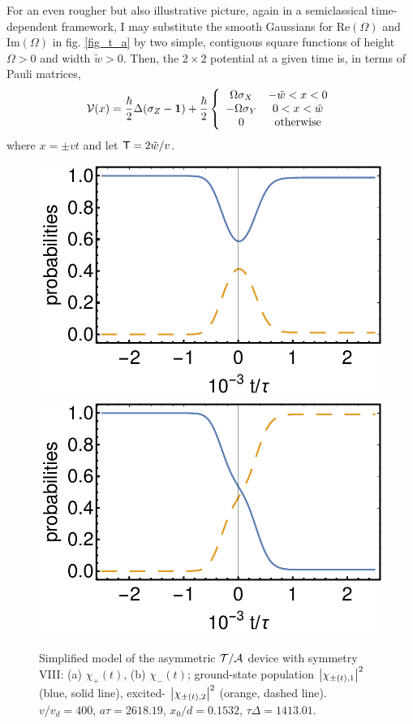 For an  even rougher but also illustrative picture,  again in a semiclassical time-dependent framework, I  may substitute the smooth Gaussians for Re$(\Omega)$ and Im$(\Omega)$ in fig. \ref{fig_t_a} by two simple, contiguous square functions of height
$\Omega>0$ and width $\tilde{w} > 0$. Then, the $2\times2$ potential at a given time is, in terms of Pauli matrices,
%
\begin{eqnarray}
  {\cal V} (x) = \frac{\hbar}{2}\Delta (\sigma_Z-{\mathbf 1})+ \frac{\hbar}{2} \left\{\begin{array}{cc}
  \Omega\sigma_X & -\tilde w < x < 0\\
  -\Omega\sigma_Y & 0 < x < \tilde w\\
  0 & \mbox{otherwise}
  \end{array}\right.
\end{eqnarray}
%
where $x = \pm v t$ and let ${\sf T}=2 \tilde w/v$.

\begin{figure}
  \begin{center}
  \includegraphics[width=0.48\linewidth]{Figures/asym_fig_t_a_approx_left.pdf}
  \includegraphics[width=0.48\linewidth]{Figures/asym_fig_t_a_approx_right.pdf}
  \end{center}
  \caption{Simplified model of the asymmetric ${\cal T/A}$ device with symmetry VIII: (a) $\chi_+(t)$, (b) $\chi_-(t)$; ground-state population $\left| \chi_{\pm(t),1} \right|^2$ (blue, solid line), excited-
  $\left| \chi_{\pm(t),2} \right|^2$ (orange, dashed line). $v/v_d = 400$, $a\tau = 2618.19$,
  $x_0/d = 0.1532$, $\tau\Delta = 1413.01$.
  \label{fig_t_a_approx}}
\end{figure}

